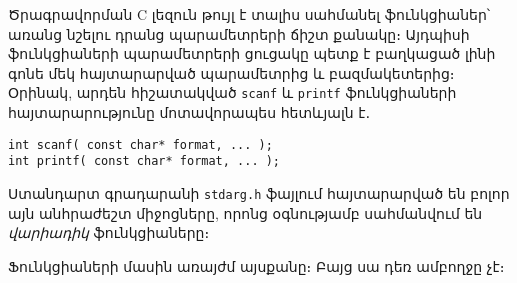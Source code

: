 Ծրագրավորման C լեզուն թույլ է տալիս սահմանել ֆունկցիաներ՝ առանց նշելու
դրանց պարամետրերի ճիշտ քանակը։ Այդպիսի ֆունկցիաների պարամետրերի ցուցակը
պետք է բաղկացած լինի գոնե մեկ հայտարարված պարամետրից և բազմակետերից։
Օրինակ, արդեն հիշատակված \texttt{scanf} և \texttt{printf} ֆունկցիաների
հայտարարությունը մոտավորապես հետևյալն է․

\begin{Verbatim}
int scanf( const char* format, ... );
int printf( const char* format, ... );
\end{Verbatim}

Ստանդարտ գրադարանի \texttt{stdarg.h} ֆայլում հայտարարված են բոլոր այն
անհրաժեշտ միջոցները, որոնց օգնությամբ սահմանվում են \emph{վարիադիկ}
ֆունկցիաները։

Ֆունկցիաների մասին առայժմ այսքանը։ Բայց սա դեռ ամբողջը չէ։
